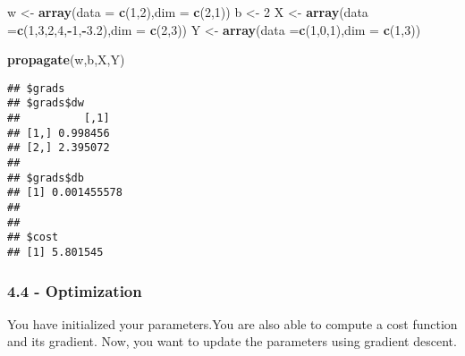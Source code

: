 \documentclass[]{article}
\newenvironment{Shaded}{\begin{snugshade}}{\end{snugshade}}
\newcommand{\KeywordTok}[1]{\textcolor[rgb]{0.13,0.29,0.53}{\textbf{#1}}}
\newcommand{\DataTypeTok}[1]{\textcolor[rgb]{0.13,0.29,0.53}{#1}}
\newcommand{\DecValTok}[1]{\textcolor[rgb]{0.00,0.00,0.81}{#1}}
\newcommand{\FloatTok}[1]{\textcolor[rgb]{0.00,0.00,0.81}{#1}}
\newcommand{\StringTok}[1]{\textcolor[rgb]{0.31,0.60,0.02}{#1}}
\newcommand{\OperatorTok}[1]{\textcolor[rgb]{0.81,0.36,0.00}{\textbf{#1}}}
\newcommand{\NormalTok}[1]{#1}
\begin{document}
\begin{Shaded}
\begin{Highlighting}[]
\NormalTok{w <-}\StringTok{ }\KeywordTok{array}\NormalTok{(}\DataTypeTok{data =} \KeywordTok{c}\NormalTok{(}\DecValTok{1}\NormalTok{,}\DecValTok{2}\NormalTok{),}\DataTypeTok{dim =} \KeywordTok{c}\NormalTok{(}\DecValTok{2}\NormalTok{,}\DecValTok{1}\NormalTok{))}
\NormalTok{b <-}\StringTok{ }\DecValTok{2}
\NormalTok{X <-}\StringTok{ }\KeywordTok{array}\NormalTok{(}\DataTypeTok{data =}\KeywordTok{c}\NormalTok{(}\DecValTok{1}\NormalTok{,}\DecValTok{3}\NormalTok{,}\DecValTok{2}\NormalTok{,}\DecValTok{4}\NormalTok{,}\OperatorTok{-}\DecValTok{1}\NormalTok{,}\OperatorTok{-}\FloatTok{3.2}\NormalTok{),}\DataTypeTok{dim =} \KeywordTok{c}\NormalTok{(}\DecValTok{2}\NormalTok{,}\DecValTok{3}\NormalTok{))}
\NormalTok{Y <-}\StringTok{ }\KeywordTok{array}\NormalTok{(}\DataTypeTok{data =}\KeywordTok{c}\NormalTok{(}\DecValTok{1}\NormalTok{,}\DecValTok{0}\NormalTok{,}\DecValTok{1}\NormalTok{),}\DataTypeTok{dim =} \KeywordTok{c}\NormalTok{(}\DecValTok{1}\NormalTok{,}\DecValTok{3}\NormalTok{))}

\KeywordTok{propagate}\NormalTok{(w,b,X,Y)}
\end{Highlighting}
\end{Shaded}

\begin{verbatim}
## $grads
## $grads$dw
##          [,1]
## [1,] 0.998456
## [2,] 2.395072
## 
## $grads$db
## [1] 0.001455578
## 
## 
## $cost
## [1] 5.801545
\end{verbatim}

\subsubsection{4.4 - Optimization}\label{optimization}

You have initialized your parameters.You are also able to compute a cost
function and its gradient. Now, you want to update the parameters using
gradient descent.
\end{document}
